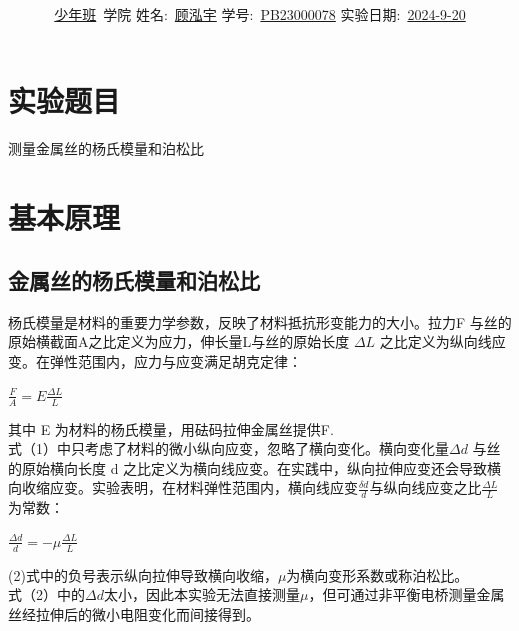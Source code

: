 \documentclass[12pt,a4paper]{article}
\title{\Huge{\textbf{\uuline{实\ 验\ 报\ 告}}}}
\author{\uline{少年班}\ 学院 \quad 姓名:\ \uline{顾泓宇} \quad 学号:\ \uline{PB23000078} \quad 实验日期:\ \uline{2024-9-20} }
\date{}
\begin{document}
	\maketitle

	\section{实验题目}
	测量金属丝的杨氏模量和泊松比
	
	\section{基本原理}
	\subsection{金属丝的杨氏模量和泊松比}
	杨氏模量是材料的重要力学参数，反映了材料抵抗形变能力的大小。拉力F
	与丝的原始横截面A之比定义为应力，伸长量L与丝的原始长度 $\Delta L$ 之比定义为纵向线应变。在弹性范围内，应力与应变满足胡克定律：\\
	\begin{center}
		$\frac{F}{A}=E \frac{\Delta L}{L}$
	\end{center}
	其中 E 为材料的杨氏模量，用砝码拉伸金属丝提供F.\\
	式（1）中只考虑了材料的微小纵向应变，忽略了横向变化。横向变化量$\Delta d$
	与丝的原始横向长度 d 之比定义为横向线应变。在实践中，纵向拉伸应变还会导致横向收缩应变。实验表明，在材料弹性范围内，横向线应变$\frac{\delta d}{d}$与纵向线应变之比$\frac{\Delta L}{L}$为常数：\\
	\begin{center}
		$\frac{\Delta d}{d}=-\mu \frac{\Delta L}{L}$
	\end{center}
	(2)式中的负号表示纵向拉伸导致横向收缩，$\mu$为横向变形系数或称泊松比。\\
	式（2）中的$\Delta d$太小，因此本实验无法直接测量$\mu$，但可通过非平衡电桥测量金属丝经拉伸后的微小电阻变化而间接得到。
\end{document}
